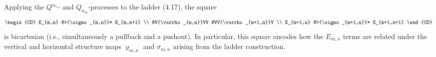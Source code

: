 \begin{theorem}[Theorem 4.6]
Applying the $Q^{\alpha_n}$- and $Q_{\sigma_m}$-processes to the ladder (4.17), the square
\[
\begin{CD}
E_{m,n} @>{\sigma_{m,n}}>> E_{m,n+1} \\
@V{\varrho_{m,n}}VV @VV{\varrho_{m+1,n}}V \\
E_{m+1,n} @>{\sigma_{m+1,n}}>> E_{m+1,n+1}
\end{CD}
\]
is bicartesian (i.e., simultaneously a pullback and a pushout). In particular, this square encodes how the $E_{m,n}$ terms are related under the vertical and horizontal structure maps $\varrho_{m,n}$ and $\sigma_{m,n}$ arising from the ladder construction.
\end{theorem}

